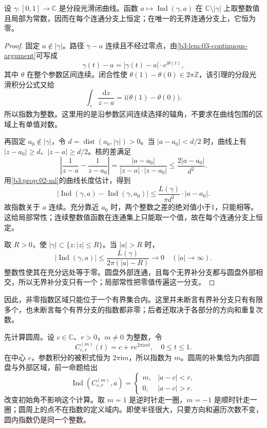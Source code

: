 \begin{proposition}\label{b3:prop:10-index-components}
设 \(\gamma:[0,1]\to\mathbb C\) 是分段光滑闭曲线。函数 \(a\mapsto\operatorname{Ind}(\gamma,a)\) 在 \(\mathbb C\setminus|\gamma|\) 上取整数值且局部为常数，因而在每个连通分支上恒定；在唯一的无界连通分支上，它恒为零。
\end{proposition}
\begin{proof}
固定 \(a\notin|\gamma|\)。路径 \(\gamma-a\) 连续且不经过零点，由\cref{b3:lem:03-continuous-argument}可写成
\[
 \gamma(t)-a=|\gamma(t)-a|\cdot e^{\mathrm i\theta(t)},
\]
其中 \(\theta\) 在整个参数区间连续。闭合性使 \(\theta(1)-\theta(0)\in2\pi\mathbb Z\)，该引理的分段光滑积分公式又给
\[
 \int_\gamma\frac{\mathrm dz}{z-a}
 =\mathrm i\bigl(\theta(1)-\theta(0)\bigr).
\]
所以指数为整数。这里用的是沿参数区间连续选择的辐角，不要求在曲线包围的区域上有单值对数。

再固定 \(a_0\notin|\gamma|\)，令 \(d=\operatorname{dist}(a_0,|\gamma|)>0\)。当 \(|a-a_0|<d/2\) 时，曲线上有 \(|z-a_0|\ge d\)、\(|z-a|\ge d/2\)。核的差满足
\[
 \left|\frac1{z-a}-\frac1{z-a_0}\right|
 =\frac{|a-a_0|}{|z-a|\cdot|z-a_0|}
 \le\frac{2|a-a_0|}{d^2}.
\]
用\cref{b3:prop:02-ml}的曲线长度估计，得到
\[
 |\operatorname{Ind}(\gamma,a)-\operatorname{Ind}(\gamma,a_0)|
 \le\frac{L(\gamma)}{\pi d^2}\cdot|a-a_0|.
\]
故指数关于 \(a\) 连续。充分靠近 \(a_0\) 时，两个整数之差的绝对值小于1，只能相等。这给局部常性；连续整数值函数在连通集上只能取一个值，故在每个连通分支上恒定。

取 \(R>0\)，使 \(|\gamma|\subset\{z:|z|\le R\}\)。当 \(|a|>R\) 时，
\[
 |\operatorname{Ind}(\gamma,a)|
 \le\frac{L(\gamma)}{2\pi(|a|-R)}\longrightarrow0
 \quad (|a|\to\infty).
\]
整数性使其在充分远处等于零。圆盘外部连通，且每个无界补分支都与圆盘外部相交，所以无界补分支只有一个；局部常性把零值传遍这一分支。
\end{proof}
因此，非零指数区域只能位于一个有界集合内。这里并未断言有界补分支只有有限多个，也未断言每个有界分支的指数都非零；后者还取决于各部分的方向和重复次数。

\ProseParagraphBreak
先计算圆周。设 \(c\in\mathbb C\)、\(r>0\)，\(m\ne0\) 为整数，令
\[
 C_{c,r}^{(m)}(t)=c+re^{2\pi\mathrm i mt},\quad 0\le t\le1.
\]
在中心 \(c\)，参数积分的被积式恒为 \(2\pi\mathrm i m\)，所以指数为 \(m\)。圆周的补集恰为内部圆盘与外部区域，前一命题给出
\[
 \operatorname{Ind}(C_{c,r}^{(m)},a)=
 \begin{cases}
 m,&|a-c|<r,\\
 0,&|a-c|>r.
 \end{cases}
\]
改变初始角不影响这个计算。取 \(m=1\) 是逆时针走一圈，\(m=-1\) 是顺时针走一圈；圆周上的点不在指数的定义域内。即使半径很大，只要方向和遍历次数不变，圆内指数仍是同一个整数。

